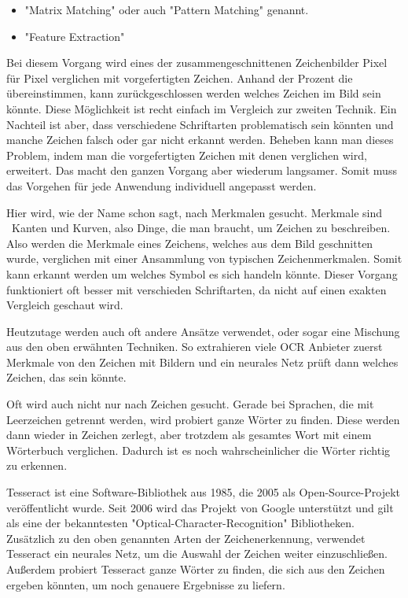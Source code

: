 \begin{itemize}
    \item "Matrix Matching" oder auch "Pattern Matching" genannt.
    \item "Feature Extraction"
\end{itemize}


Bei diesem Vorgang wird eines der zusammengeschnittenen Zeichenbilder Pixel für Pixel verglichen mit vorgefertigten Zeichen. Anhand der Prozent die übereinstimmen, kann zurückgeschlossen werden welches Zeichen im Bild sein könnte. Diese Möglichkeit ist recht einfach im Vergleich zur zweiten Technik. Ein Nachteil ist aber, dass verschiedene Schriftarten problematisch sein könnten und manche Zeichen falsch oder gar nicht erkannt werden. Beheben kann man dieses Problem, indem man die vorgefertigten Zeichen mit denen verglichen wird, erweitert. Das macht den ganzen Vorgang aber wiederum langsamer. Somit muss das Vorgehen für jede Anwendung individuell angepasst werden.\cite{OCRRecognition}


Hier wird, wie der Name schon sagt, nach Merkmalen gesucht. Merkmale sind \zb\ Kanten und Kurven, also Dinge, die man braucht, um Zeichen zu beschreiben. Also werden die Merkmale eines Zeichens, welches aus dem Bild geschnitten wurde, verglichen mit einer Ansammlung von typischen Zeichenmerkmalen. Somit kann erkannt werden um welches Symbol es sich handeln könnte. Dieser Vorgang funktioniert oft besser mit verschieden Schriftarten, da nicht auf einen exakten Vergleich geschaut wird.\cite{OCRRecognition}

Heutzutage werden auch oft andere Ansätze verwendet, oder sogar eine Mischung aus den oben erwähnten Techniken. So extrahieren viele OCR Anbieter zuerst Merkmale von den Zeichen mit Bildern und ein neurales Netz prüft dann welches Zeichen, das sein könnte.

Oft wird auch nicht nur nach Zeichen gesucht. Gerade bei Sprachen, die mit Leerzeichen getrennt werden, wird probiert ganze Wörter zu finden. Diese werden dann wieder in Zeichen zerlegt, aber trotzdem als gesamtes Wort mit einem Wörterbuch verglichen. Dadurch ist es noch wahrscheinlicher die Wörter richtig zu erkennen. 

\label{sec:tesseract}

Tesseract ist eine Software-Bibliothek aus 1985, die 2005 als Open-Source-Projekt veröffentlicht wurde. Seit 2006 wird das Projekt von Google unterstützt und gilt als eine der bekanntesten "Optical-Character-Recognition" Bibliotheken. Zusätzlich zu den oben genannten Arten der Zeichenerkennung, verwendet Tesseract ein neurales Netz, um die Auswahl der Zeichen weiter einzuschließen. Außerdem probiert Tesseract ganze Wörter zu finden, die sich aus den Zeichen ergeben könnten, um noch genauere Ergebnisse zu liefern.\cite{Tesseract}

